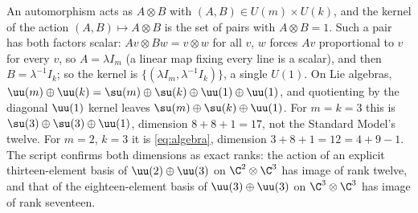 An automorphism acts as $A \otimes B$ with $(A, B) \in U(m) \times U(k)$, and the kernel of the action $(A, B) \mapsto A \otimes B$ is the set of pairs with $A \otimes B = 1$. Such a pair has both factors scalar: $Av \otimes Bw = v \otimes w$ for all $v$, $w$ forces $Av$ proportional to $v$ for every $v$, so $A = \lambda I_{m}$ (a linear map fixing every line is a scalar), and then $B = \lambda^{-1}I_{k}$; so the kernel is $\{(\lambda I_{m}, \lambda^{-1}I_{k})\}$, a single $U(1)$. On Lie algebras, $\uu(m) \oplus \uu(k) = \su(m) \oplus \su(k) \oplus \uu(1) \oplus \uu(1)$, and quotienting by the diagonal $\uu(1)$ kernel leaves $\su(m) \oplus \su(k) \oplus \uu(1)$. For $m = k = 3$ this is $\su(3) \oplus \su(3) \oplus \uu(1)$, dimension $8 + 8 + 1 = 17$, not the Standard Model's twelve. For $m = 2$, $k = 3$ it is \eqref{eq:algebra}, dimension $3 + 8 + 1 = 12 = 4 + 9 - 1$. The script confirms both dimensions as exact ranks: the action of an explicit thirteen-element basis of $\uu(2) \oplus \uu(3)$ on $\C^{2} \otimes \C^{3}$ has image of rank twelve, and that of the eighteen-element basis of $\uu(3) \oplus \uu(3)$ on $\C^{3} \otimes \C^{3}$ has image of rank seventeen.
